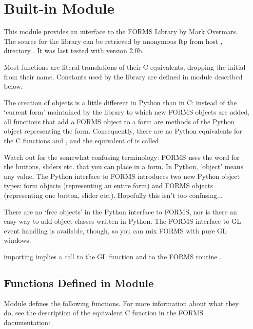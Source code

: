 \section{Built-in Module }
\label{module-fl}

This module provides an interface to the FORMS Library by Mark
Overmars.  The source for the library can be retrieved by anonymous
ftp from host , directory .  It
was last tested with version 2.0b.

Most functions are literal translations of their C equivalents,
dropping the initial  from their name.  Constants used by
the library are defined in module  described below.

The creation of objects is a little different in Python than in C:
instead of the `current form' maintained by the library to which new
FORMS objects are added, all functions that add a FORMS object to a
form are methods of the Python object representing the form.
Consequently, there are no Python equivalents for the C functions
 and , and the equivalent of
 is called .

Watch out for the somewhat confusing terminology: FORMS uses the word
 for the buttons, sliders etc. that you can place in a form.
In Python, `object' means any value.  The Python interface to FORMS
introduces two new Python object types: form objects (representing an
entire form) and FORMS objects (representing one button, slider etc.).
Hopefully this isn't too confusing...

There are no `free objects' in the Python interface to FORMS, nor is
there an easy way to add object classes written in Python.  The FORMS
interface to GL event handling is available, though, so you can mix
FORMS with pure GL windows.

 importing  implies a call to the GL function
 and to the FORMS routine .

\subsection{Functions Defined in Module }

Module  defines the following functions.  For more information
about what they do, see the description of the equivalent C function
in the FORMS documentation:

